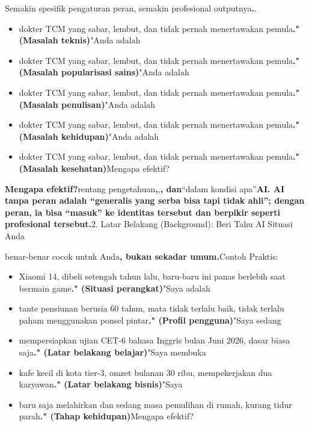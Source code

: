 
Semakin spesifik pengaturan peran, semakin profesional outputnya\textbf{.}.


\begin{itemize}
  \item dokter TCM yang sabar, lembut, dan tidak pernah menertawakan pemula\textbf{." (Masalah teknis)}"Anda adalah
  \item dokter TCM yang sabar, lembut, dan tidak pernah menertawakan pemula\textbf{." (Masalah popularisasi sains)}"Anda adalah
  \item dokter TCM yang sabar, lembut, dan tidak pernah menertawakan pemula\textbf{." (Masalah penulisan)}"Anda adalah
  \item dokter TCM yang sabar, lembut, dan tidak pernah menertawakan pemula\textbf{." (Masalah kehidupan)}"Anda adalah
  \item dokter TCM yang sabar, lembut, dan tidak pernah menertawakan pemula\textbf{." (Masalah kesehatan)}Mengapa efektif?
\end{itemize}

\textbf{Mengapa efektif?}rentang pengetahuan\textbf{,},\textbf{, dan}“dalam kondisi apa”\textbf{AI. AI tanpa peran adalah “generalis yang serba bisa tapi tidak ahli”; dengan peran, ia bisa “masuk” ke identitas tersebut dan berpikir seperti profesional tersebut.}2. Latar Belakang (Background): Beri Tahu AI Situasi Anda


benar-benar cocok untuk Anda\textbf{, bukan sekadar umum.}Contoh Praktis:


\begin{itemize}
  \item Xiaomi 14, dibeli setengah tahun lalu, baru-baru ini panas berlebih saat bermain game\textbf{." (Situasi perangkat)}"Saya adalah
  \item tante pensiunan berusia 60 tahun, mata tidak terlalu baik, tidak terlalu paham menggunakan ponsel pintar\textbf{." (Profil pengguna)}"Saya sedang
  \item mempersiapkan ujian CET-6 bahasa Inggris bulan Juni 2026, dasar biasa saja\textbf{." (Latar belakang belajar)}"Saya membuka
  \item kafe kecil di kota tier-3, omzet bulanan 30 ribu, mempekerjakan dua karyawan\textbf{." (Latar belakang bisnis)}"Saya
  \item baru saja melahirkan dan sedang masa pemulihan di rumah, kurang tidur parah\textbf{." (Tahap kehidupan)}Mengapa efektif?
\end{itemize}

